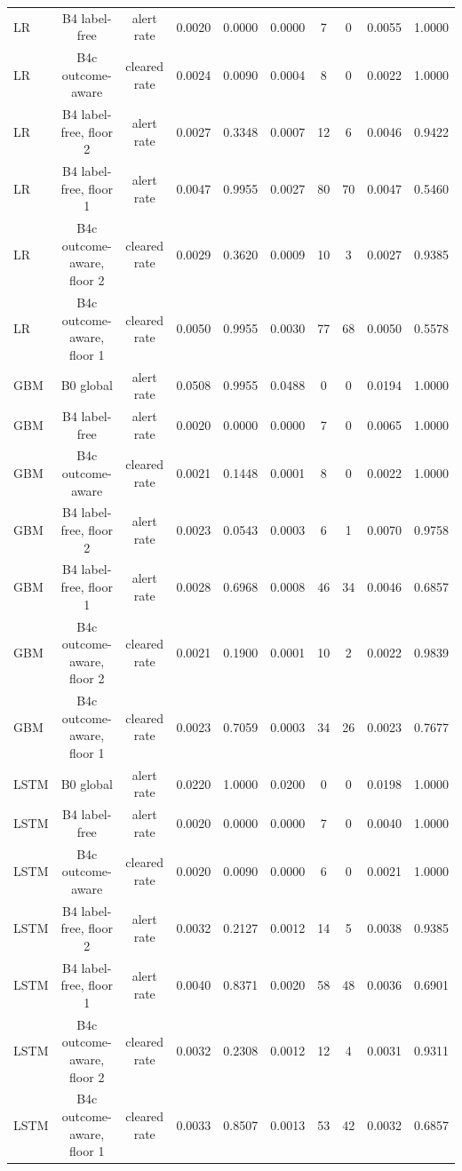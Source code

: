 \documentclass[10pt,onecolumn,letterpaper]{article}
\begin{document}
\begin{table}[!t]
{\begin{tabular}{lccccccccc}
LR & B4 label-free & alert rate & 0.0020 & 0.0000 & 0.0000 & 7 & 0 & 0.0055 & 1.0000 \\
LR & B4c outcome-aware & cleared rate & 0.0024 & 0.0090 & 0.0004 & 8 & 0 & 0.0022 & 1.0000 \\
LR & B4 label-free, floor 2 & alert rate & 0.0027 & 0.3348 & 0.0007 & 12 & 6 & 0.0046 & 0.9422 \\
LR & B4 label-free, floor 1 & alert rate & 0.0047 & 0.9955 & 0.0027 & 80 & 70 & 0.0047 & 0.5460 \\
LR & B4c outcome-aware, floor 2 & cleared rate & 0.0029 & 0.3620 & 0.0009 & 10 & 3 & 0.0027 & 0.9385 \\
LR & B4c outcome-aware, floor 1 & cleared rate & 0.0050 & 0.9955 & 0.0030 & 77 & 68 & 0.0050 & 0.5578 \\
GBM & B0 global & alert rate & 0.0508 & 0.9955 & 0.0488 & 0 & 0 & 0.0194 & 1.0000 \\
GBM & B4 label-free & alert rate & 0.0020 & 0.0000 & 0.0000 & 7 & 0 & 0.0065 & 1.0000 \\
GBM & B4c outcome-aware & cleared rate & 0.0021 & 0.1448 & 0.0001 & 8 & 0 & 0.0022 & 1.0000 \\
GBM & B4 label-free, floor 2 & alert rate & 0.0023 & 0.0543 & 0.0003 & 6 & 1 & 0.0070 & 0.9758 \\
GBM & B4 label-free, floor 1 & alert rate & 0.0028 & 0.6968 & 0.0008 & 46 & 34 & 0.0046 & 0.6857 \\
GBM & B4c outcome-aware, floor 2 & cleared rate & 0.0021 & 0.1900 & 0.0001 & 10 & 2 & 0.0022 & 0.9839 \\
GBM & B4c outcome-aware, floor 1 & cleared rate & 0.0023 & 0.7059 & 0.0003 & 34 & 26 & 0.0023 & 0.7677 \\
LSTM & B0 global & alert rate & 0.0220 & 1.0000 & 0.0200 & 0 & 0 & 0.0198 & 1.0000 \\
LSTM & B4 label-free & alert rate & 0.0020 & 0.0000 & 0.0000 & 7 & 0 & 0.0040 & 1.0000 \\
LSTM & B4c outcome-aware & cleared rate & 0.0020 & 0.0090 & 0.0000 & 6 & 0 & 0.0021 & 1.0000 \\
LSTM & B4 label-free, floor 2 & alert rate & 0.0032 & 0.2127 & 0.0012 & 14 & 5 & 0.0038 & 0.9385 \\
LSTM & B4 label-free, floor 1 & alert rate & 0.0040 & 0.8371 & 0.0020 & 58 & 48 & 0.0036 & 0.6901 \\
LSTM & B4c outcome-aware, floor 2 & cleared rate & 0.0032 & 0.2308 & 0.0012 & 12 & 4 & 0.0031 & 0.9311 \\
LSTM & B4c outcome-aware, floor 1 & cleared rate & 0.0033 & 0.8507 & 0.0013 & 53 & 42 & 0.0032 & 0.6857 \\
\bottomrule
\end{tabular}}
\end{table}
\end{document}
